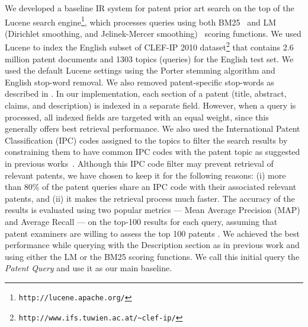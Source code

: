 We developed a baseline IR system for patent prior art search on the top of
the Lucene search engine\footnote{\texttt{http://lucene.apache.org/}}, which processes queries using both BM25~\cite{Robertson1993} and LM (Dirichlet
smoothing, and Jelinek-Mercer smoothing)~\cite{Zhai2001} scoring functions. %
We used Lucene to index the English subset of CLEF-IP 2010 dataset\footnote{\texttt{http://www.ifs.tuwien.ac.at/\textasciitilde{}clef-ip/}} 
that contains 2.6 million patent documents and 1303 topics (queries) for the English test set.
We used the default Lucene settings using the Porter stemming algorithm \cite{Porter1980} and English stop-word removal. 
We also removed patent-specific stop-words as described in \cite{magdy2012toward}.
In
our implementation, each section of a patent (title, abstract, claims,
and description) is indexed in a separate field. However, when a query 
is processed, all indexed fields are targeted with an equal weight, since this generally
offers best retrieval performance. We also used the International
Patent Classification (IPC) codes assigned to the topics to filter
the search results by constraining them to have common IPC codes with
the patent topic as suggested in previous works~\cite{lopez2010patatras}.
Although this IPC code filter may prevent retrieval of relevant patents, we
have chosen to keep it for the following reasons: (i) more than 80\%
of the patent queries share an IPC code with their associated relevant
patents, and (ii) it makes the retrieval process much faster. The accuracy of the results is evaluated using two popular metrics --- Mean Average Precision (MAP) and Average Recall --- on the top-100 results for each query, assuming that patent examiners are willing to assess the top 100 patents \cite{joho2010survey}. 
We achieved the best performance while querying with the Description
section as in previous work \cite{xue2009transforming} and using
either the LM or the BM25 scoring functions. We call this initial
query the \textit{Patent Query} and use it as our main baseline.

